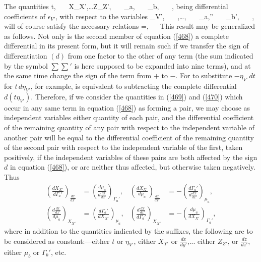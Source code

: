 \documentclass[12pt]{article}
\begin{document}
{The quantities
\eqs t, \ \ \ X_{X'},\dots Z_{Z'}, \ \ \ \mu_a, \ \ \ \mu_b, \ \ \ ,       \label{469} \eqe
being differential coefficients of $\epsilon_{V'}$, with respect to the variables
\eqs \eta_{V'}, \ \ \ ,\dots {}, \ \ \ \Gamma_a,'' \ \ \ \Gamma_b', \ \ \ , \label{470} \eqe
will of course satisfy the necessary relations
\eqs {}=, \ \          \label{471} \eqe
This result may be generalized as follows. Not only is the second member of equation (\ref{468}) a complete differential in its present form, but it will remain such if we transfer the sign of differentiation $(d)$ from one factor to the other of any term (the sum indicated by the
symbol $\sum\sum\nolimits'$ is here supposed to be expanded into nine terms), and at the same time change the sign of the term from $+$ to $-$. For to substitute $-\eta_{V'} \,dt$ for $t\,d\eta_{V'}$, for example, is equivalent to subtracting the complete differential $d(t\eta_{V'})$. Therefore, if we consider the quantities in (\ref{469}) and (\ref{470}) which occur in any same term in equation (\ref{468}) as forming a pair, we may choose as independent variables either quantity of each pair, and the differential coefficient of the remaining quantity of any pair with respect to the independent variable of another pair will be equal to the differential coefficient of the remaining quantity of the second pair with respect to the independent variable of the first, taken positively, if the independent variables of these pairs are both affected by the sign $d$ in equation (\ref{468}), or are neither thus affected, but otherwise taken negatively. Thus
\begin{align}
\left( \frac{dX_{X'}}{d\Gamma_a'}\right)_{\frac{dx}{dx'}} &=   \left(\frac{d\mu_a}{d\frac{dx}{dx'}} \right)_{\Gamma_a'},     &    
\left( \frac{dX_{X'}}{d\mu_a}\right)_{\frac{dx}{dx'}} &=  - \left(\frac{d\Gamma_a'}{d\frac{dx}{dx'}} \right)_{\mu_a},    \label{472} \\
\left( \frac{d\frac{dx}{dx'}}{d\mu_a}\right)_{X_{X'}} &=   \left(\frac{d\Gamma_a'}{d X_{X'}} \right)_{\mu_a},     &    
\left( \frac{d\frac{dx}{dx'}}{d\Gamma_a'}\right)_{X_{X'}} &=  -\left(\frac{d\mu_a}{d X_{X'}} \right)_{\Gamma_a'},   \label{473} 
\end{align}
where in addition to the quantities indicated by the suffixes, the following are to be considered as constant:---either $t$ or $\eta_{V'}$, either $X_{Y'}$ or $\frac{dx}{dy'}$,... either $Z_{Z'}$, or $\frac{dz}{dz'}$, either $\mu_b$ or $\Gamma_b'$, etc.


}
\end{document}
